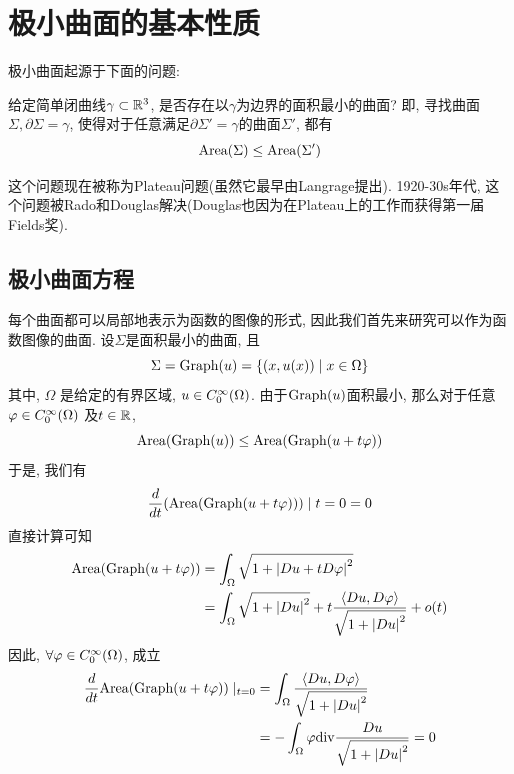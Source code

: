 \chapter{极小曲面的基本性质}
极小曲面起源于下面的问题:
\begin{question*}
    给定简单闭曲线$\gamma \subset \mathbb{R}^3$, 是否存在以$\gamma$为边界的面积最小的曲面? 即, 寻找曲面$\Sigma, \partial \Sigma = \gamma$, 使得对于任意满足$\partial \Sigma' = \gamma$的曲面$\Sigma'$, 都有
    \begin{equation*}
        \text{Area}(\Sigma) \le \text{Area}(\Sigma')
    \end{equation*}
\end{question*}
这个问题现在被称为Plateau问题(虽然它最早由Langrage提出). 1920-30s年代, 这个问题被Rado和Douglas解决(Douglas也因为在Plateau上的工作而获得第一届Fields奖).
\section{极小曲面方程}
每个曲面都可以局部地表示为函数的图像的形式, 因此我们首先来研究可以作为函数图像的曲面. 设$\Sigma$是面积最小的曲面, 且
\begin{equation*}
    \Sigma= \text{Graph}(u)= \{(x,u(x))\mid x \in \Omega\}
\end{equation*}
其中, $\Omega$ 是给定的有界区域, $u \in {C^\infty_0}(\Omega)$. 由于$\text{Graph}(u)$面积最小, 那么对于任意$\varphi \in {C^\infty_0}(\Omega)$ 及$t \in \mathbb{R}$,
\begin{equation}
    \text{Area}(\text{Graph}(u)) \le \text{Area}(\text{Graph}(u+t\varphi))
\end{equation}
于是, 我们有
\begin{equation}
    \frac{d}{dt}(\text{Area}(\text{Graph}(u+t\varphi)))\mid {t=0}=0
\end{equation}
直接计算可知
\begin{equation}
    \begin{split}
        \text{Area}(\text{Graph}(u+t\varphi)) &= \int_\Omega \sqrt{1+\left | Du+tD\varphi \right |^2} \\
                          &= \int_\Omega \sqrt{1+\left | Du \right |^2}+t\frac{{\left < Du, D\varphi \right >}}{\sqrt{1+\left | Du \right |^2}} + o(t)
    \end{split}
\end{equation}
因此, $\forall \varphi \in {C^\infty_0}(\Omega)$, 成立
\begin{equation}
    \begin{split}
        \frac{d}{dt} \text{Area}(\text{Graph}(u+t\varphi))\mid _{t=0} & = \int_\Omega \frac{{\left < Du, D\varphi \right >}}{\sqrt{1+\left | Du \right |^2}} \\
        &=- \int_\Omega \varphi {\text{div}} \frac{Du}{\sqrt{1+\left | Du \right |^2}} =0
    \end{split}
\end{equation}
